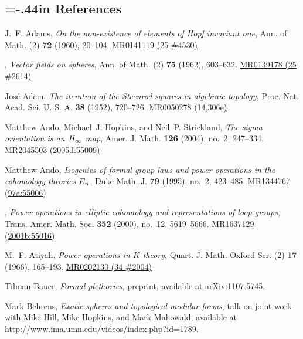 \documentclass{rs}
\theoremstyle{definition}
\theoremstyle{remark}
\begin{document}
%
%
\renewcommand\refname{}
\newcommand{\MRn}[2]{\href{http://www.ams.org/mathscinet-getitem?mr=#1}{MR#1 #2}}
\begin{thebibliography}

\section*{\leftskip=-.44in References \vspace{.13in}}

J.~F. Adams, \emph{On the non-existence of elements of {H}opf invariant one},
  Ann. of Math. (2) \textbf{72} (1960), 20--104. \MRn{0141119}{(25 \#4530)}

\bysame, \emph{Vector fields on spheres}, Ann. of Math. (2) \textbf{75} (1962),
  603--632. \MRn{0139178}{(25 \#2614)}

Jos{\'e} Adem, \emph{The iteration of the {S}teenrod squares in algebraic
  topology}, Proc. Nat. Acad. Sci. U. S. A. \textbf{38} (1952), 720--726.
  \MRn{0050278}{(14,306e)}

Matthew Ando, Michael~J. Hopkins, and Neil~P. Strickland, \emph{The sigma
  orientation is an {$H\sb \infty$} map}, Amer. J. Math. \textbf{126} (2004),
  no.~2, 247--334. \MRn{2045503}{(2005d:55009)}

Matthew Ando, \emph{Isogenies of formal group laws and power operations in the
  cohomology theories {$E\sb n$}}, Duke Math. J. \textbf{79} (1995), no.~2,
  423--485. \MRn{1344767}{(97a:55006)}

\bysame, \emph{Power operations in elliptic cohomology and representations of
  loop groups}, Trans. Amer. Math. Soc. \textbf{352} (2000), no.~12,
  5619--5666. \MRn{1637129}{(2001b:55016)}

M.~F. Atiyah, \emph{Power operations in {$K$}-theory}, Quart. J. Math. Oxford
  Ser. (2) \textbf{17} (1966), 165--193. \MRn{0202130}{(34 \#2004)}

Tilman Bauer, \emph{Formal plethories}, preprint, available at
  \href{http://arxiv.org/abs/1107.5745}{arXiv:1107.5745}.

Mark Behrens, \emph{Exotic spheres and topological modular forms}, talk on
  joint work with Mike Hill, Mike Hopkins, and Mark Mahowald, available at
  \href{http://www.ima.umn.edu/videos/index.php?id=1789}{http://www.ima.umn.edu\linebreak/videos/index.php?id=1789}.


\end{thebibliography}
\end{document}
